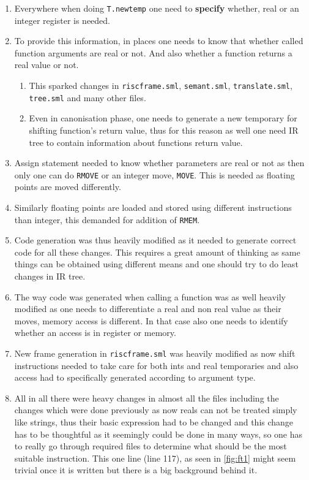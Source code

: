 \begin{enumerate}
  \item Everywhere when doing \texttt{T.newtemp} one need to \textbf{specify} whether, real or an integer register is needed. 
  \item To provide this information, in places one needs to know that whether called function arguments are real or not. And also whether a function returns a real value or not. 
    \begin{enumerate}
      \item This sparked changes in \texttt{riscframe.sml}, \texttt{semant.sml}, \texttt{translate.sml}, \texttt{tree.sml} and many other files.
      \item Even in canonisation phase, one needs to generate a new temporary for shifting function's return value, thus for this reason as well one need IR tree to contain information about functions return value.
    \end{enumerate}
  \item Assign statement needed to know whether parameters are real or not as then only one can do \texttt{RMOVE} or an integer move, \texttt{MOVE}. This is needed as floating points are moved differently.
  \item Similarly floating points are loaded and stored using different instructions than integer, this demanded for addition of \texttt{RMEM}.
  \item Code generation was thus heavily modified as it needed to generate correct code for all these changes. This requires a great amount of thinking as same things can be obtained using different means and one should try to do least changes in IR tree. 
  \item The way code was generated when calling a function was as well heavily modified as one needs to differentiate a real and non real value as their moves, memory access is different. In that case also one needs to identify whether an access is in register or memory.
  \item New frame generation in \texttt{riscframe.sml} was heavily modified as now shift instructions needed to take care for both ints and real temporaries and also access had to specifically generated according to argument type.
  \item All in all there were heavy changes in almost all the files including the changes which were done previously as now reals can not be treated simply like strings, thus their basic expression had to be changed and this change has to be thoughtful as it seemingly could be done in many ways, so one has to really go through required files to determine what should be the most suitable instruction. This one line (line 117), as seen in \ref{fig:ft1} might seem trivial once it is written but there is a big background behind it.

\end{enumerate}
